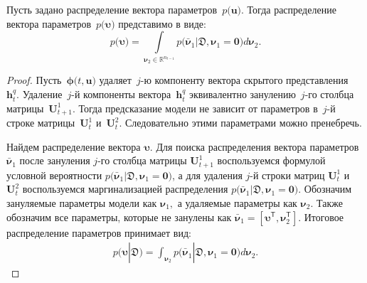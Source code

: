 \begin{theorem}
Пусть задано распределение вектора параметров~$p\bigr(\mathbf{u}\bigr).$ Тогда распределение вектора параметров~$p\bigr(\bm{\upsilon}\bigr)$ представимо в виде:
\[
p\bigr(\bm{\upsilon}\bigr)  = \int\limits_{ \bm{\nu}_2 \in \mathbb{R}^{n_{t-1}}}p\bigr(\bar{\bm{\nu}}_1|\mathfrak{D}, \bm{\nu}_1=\mathbf{0}\bigr) d \bm{\nu}_2.
\]
\end{theorem}
\begin{proof}
Пусть~$\bm{\phi}\bigr(t, \mathbf{u}\bigr)$ удаляет~$j$-ю компоненту вектора скрытого представления~$\mathbf{h}^{q}_{t}.$ Удаление~$j$-й компоненты вектора~$\mathbf{h}^{q}_{t}$ эквивалентно занулению~$j$-го столбца матрицы~$\mathbf{U}^{1}_{t+1}.$ Тогда предсказание модели не зависит от параметров в~$j$-й строке матрицы~$\mathbf{U}^{1}_{t}$ и~$\mathbf{U}^2_{t}.$ Следовательно этими параметрами можно пренебречь.

Найдем распределение вектора $\bm{\upsilon}.$ Для поиска распределения вектора параметров~$\bar{\bm{\nu}}_1$ после зануления $j$-го столбца матрицы $\mathbf{U}^{1}_{t+1}$ воспользуемся формулой условной вероятности $p\bigr(\bar{\bm{\nu}}_1|\mathfrak{D}, \bm{\nu}_1=\mathbf{0}\bigr)$, а для удаления $j$-й строки матриц $\mathbf{U}^{1}_{t}$ и $\mathbf{U}^{2}_{t}$ воспользуемся маргинализацией распределения $p\bigr(\bar{\bm{\nu}}_1|\mathfrak{D}, \bm{\nu}_1=\mathbf{0}\bigr)$. Обозначим зануляемые параметры модели как $\bm{\nu}_1,$ а удаляемые параметры как $\bm{\nu}_2.$ Также обозначим все параметры, которые не занулены как $\bar{\bm{\nu}}_1 = [\bm{\upsilon}^{\mathsf{T}}, \bm{\nu}_2^{\mathsf{T}}].$ Итоговое распределение параметров принимает  вид:
\[
\begin{aligned}
p\bigr(\bm{\upsilon}|\mathfrak{D}\bigr)  = \int_{\bm{\nu}_2}p\bigr(\bar{\bm{\nu}}_1|\mathfrak{D}, \bm{\nu}_1=\mathbf{0}\bigr) d\bm{\nu}_2.
\end{aligned}
\]
\end{proof}

